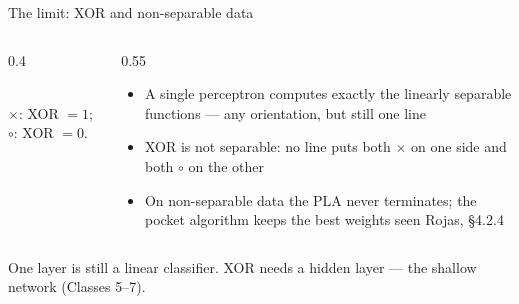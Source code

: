 \documentclass[aspectratio=169, 11pt]{beamer}
\newcommand{\figsource}[1]{{\scriptsize\color{mcMuted} #1}}
\begin{document}
\begin{frame}{The limit: XOR and non-separable data}
  \begin{columns}[T, onlytextwidth]
    \begin{column}{0.4\textwidth}
      \centering
      \\[0.1em]
      \figsource{$\bm\times$: XOR $=1$; \; $\circ$: XOR $=0$.}
    \end{column}
    \hfill
    \begin{column}{0.55\textwidth}
      \begin{itemize}\setlength{\itemsep}{1pt}
        \item A single perceptron computes exactly the
              \alert{linearly separable} functions --- any
              orientation, but still one line
        \item \alert{XOR} is not separable: no line puts both
              $\times$ on one side and both $\circ$ on the
              other
        \item On non-separable data the PLA \alert{never
              terminates}; the \alert{pocket algorithm} keeps
              the best weights seen
              \hfill{\scriptsize Rojas, \S4.2.4}
      \end{itemize}
    \end{column}
  \end{columns}
  \begin{redhighlight}
    One layer is still a linear classifier. XOR needs a
    \alert{hidden layer} --- the shallow network (Classes
    5--7).
  \end{redhighlight}
\end{frame}
\end{document}
